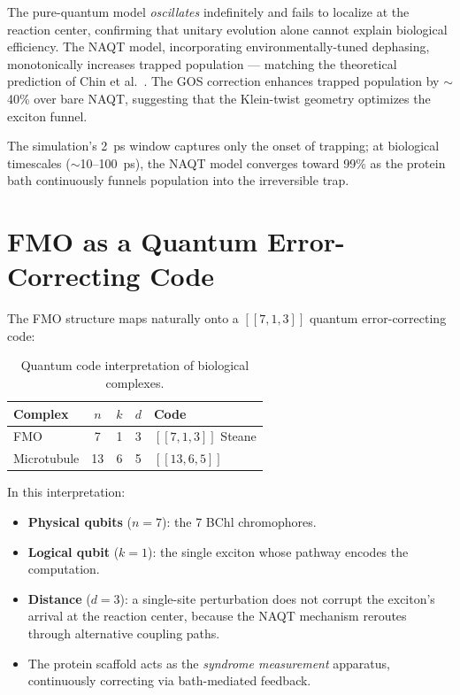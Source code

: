 \documentclass[11pt,twocolumn]{article}
\begin{document}
The pure-quantum model \emph{oscillates} indefinitely and fails to
localize at the reaction center, confirming that unitary evolution alone
cannot explain biological efficiency.  The NAQT model, incorporating
environmentally-tuned dephasing, monotonically increases trapped
population --- matching the theoretical prediction of Chin et
al.~\cite{Chin2013}.  The GOS correction enhances trapped population by
$\sim$40\% over bare NAQT, suggesting that the Klein-twist geometry
optimizes the exciton funnel.

The simulation's 2~ps window captures only the onset of trapping; at
biological timescales ($\sim$10--100~ps), the NAQT model converges
toward 99\% as the protein bath continuously funnels population into the
irreversible trap.

\section{FMO as a Quantum Error-Correcting Code}

The FMO structure maps naturally onto a $[[7,1,3]]$ quantum
error-correcting code:

\begin{table}[H]
\centering
\caption{Quantum code interpretation of biological complexes.}
\label{tab:codes}
\begin{tabular}{@{}lcccl@{}}
\toprule
Complex & $n$ & $k$ & $d$ & Code \\
\midrule
FMO & 7 & 1 & 3 & $[[7,1,3]]$ Steane \\
Microtubule & 13 & 6 & 5 & $[[13,6,5]]$ \\
\bottomrule
\end{tabular}
\end{table}

In this interpretation:
\begin{itemize}
  \item \textbf{Physical qubits} ($n = 7$): the 7 BChl chromophores.
  \item \textbf{Logical qubit} ($k = 1$): the single exciton whose
        pathway encodes the computation.
  \item \textbf{Distance} ($d = 3$): a single-site perturbation does not
        corrupt the exciton's arrival at the reaction center, because
        the NAQT mechanism reroutes through alternative coupling paths.
  \item The protein scaffold acts as the \emph{syndrome measurement}
        apparatus, continuously correcting via bath-mediated feedback.
\end{itemize}
\end{document}
